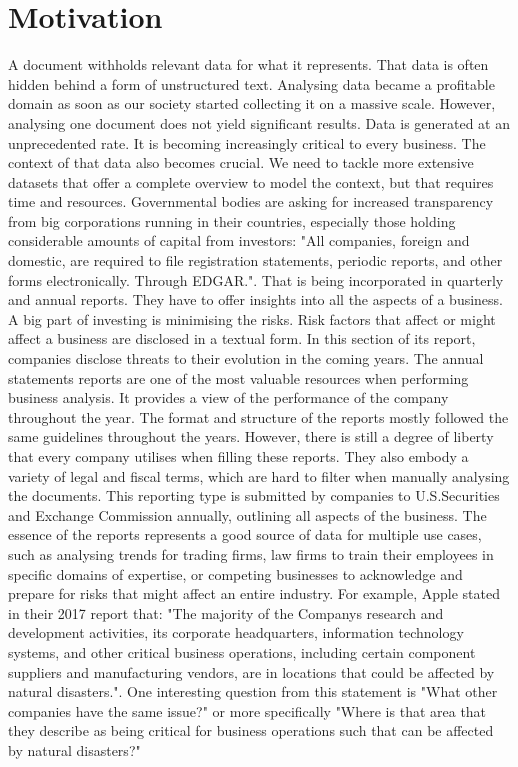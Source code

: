 \documentclass[12pt,MSc,a4paper,oneside]{muthesis}
\begin{document}

\section{Motivation}
A document withholds relevant data for what it represents. That data is often hidden behind a form of unstructured text. Analysing data became a profitable domain as soon as our society started collecting it on a massive scale. However, analysing one document does not yield significant results. Data is generated at an unprecedented rate. It is becoming increasingly critical to every business. The context of that data also becomes crucial. We need to tackle more extensive datasets that offer a complete overview to model the context, but that requires time and resources.
Governmental bodies are asking for increased transparency from big corporations running in their countries, especially those holding considerable amounts of capital from investors: "All companies, foreign and domestic, are required to file registration statements, periodic reports, and other forms electronically. Through EDGAR."\cite{EDGAR}. That is being incorporated in quarterly and annual reports. They have to offer insights into all the aspects of a business. A big part of investing is minimising the risks.
Risk factors that affect or might affect a business are disclosed in a textual form. In this section of its report, companies disclose threats to their evolution in the coming years. The annual statements reports are one of the most valuable resources when performing business analysis. It provides a view of the performance of the company throughout the year. The format and structure of the reports mostly followed the same guidelines throughout the years. However, there is still a degree of liberty that every company utilises when filling these reports. They also embody a variety of legal and fiscal terms, which are hard to filter when manually analysing the documents. This reporting type is submitted by companies to U.S.Securities and Exchange Commission annually, outlining all aspects of the business. The essence of the reports represents a good source of data for multiple use cases, such as analysing trends for trading firms, law firms to train their employees in specific domains of expertise, or competing businesses to acknowledge and prepare for risks that might affect an entire industry.
For example, Apple stated in their 2017 report that: "The majority of the Companys research and development activities, its corporate headquarters, information technology systems, and other critical business operations, including certain component suppliers and manufacturing vendors, are in locations that could be affected by natural disasters."\cite{Apple201710K}. One interesting question from this statement is "What other companies have the same issue?" or more specifically "Where is that area that they describe as being critical for business operations such that can be affected by natural disasters?"
\end{document}
